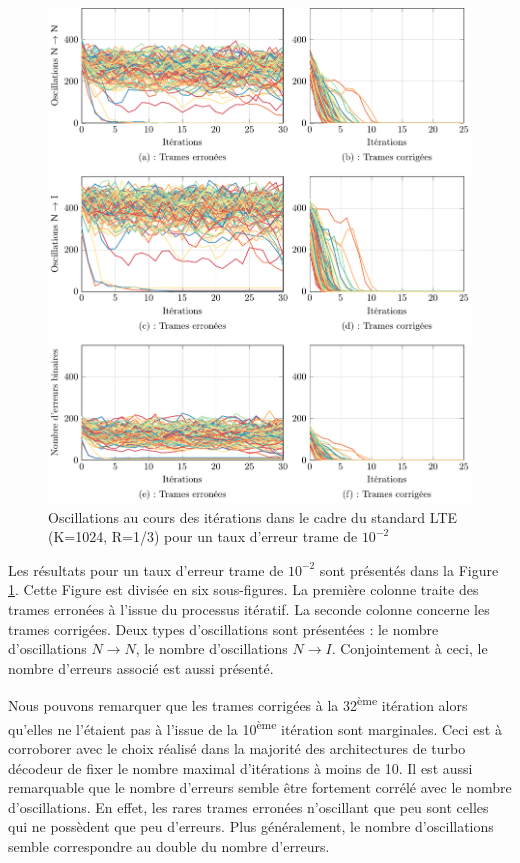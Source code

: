 \begin{figure}[!ht]
	\hspace*{-.7cm}
	\begin{center}
	\includegraphics[width=.9\textwidth]{main/ch2_fig/tikz/it_lte10-2.pdf}
	\caption{Oscillations au cours des itérations dans le cadre du standard LTE (K=1024, R=1/3) pour un taux d'erreur trame de $10^{-2}$ \label{ch2:fig:it_lte_1}}
	\end{center}
\end{figure}

Les résultats pour un taux d'erreur trame de $10^{-2}$ sont présentés dans la  Figure \ref{ch2:fig:it_lte_1}. Cette 
Figure est divisée en six sous-figures. La première colonne traite des trames erronées à l'issue du processus 
itératif. La seconde colonne concerne les trames corrigées. Deux types d'oscillations sont présentées : le nombre d'oscillations 
$N\rightarrow N$, le nombre d'oscillations $N\rightarrow I$. Conjointement à ceci, le nombre d'erreurs associé est aussi 
présenté.

Nous pouvons remarquer que les trames corrigées à la 32\textsuperscript{ème} itération alors qu'elles ne l'étaient pas à 
l'issue de la 10\textsuperscript{ème} itération sont marginales. Ceci est à corroborer avec le choix réalisé dans la majorité des 
architectures de turbo décodeur de fixer le nombre maximal d'itérations à moins de 10.
Il est aussi remarquable que le nombre d'erreurs semble être fortement corrélé avec le nombre d'oscillations. En effet, 
les rares trames erronées n'oscillant que peu sont celles qui ne possèdent que peu d'erreurs. Plus généralement,
le nombre d'oscillations semble correspondre au double du nombre d'erreurs.


